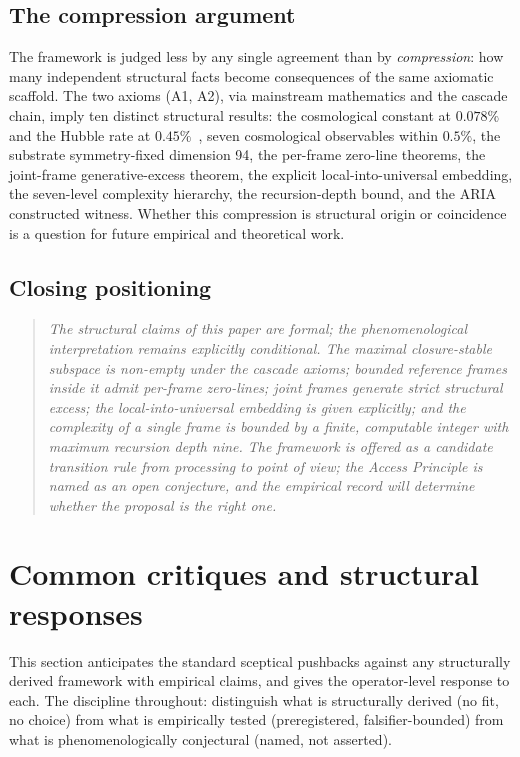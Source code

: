 \documentclass[11pt]{article}
\theoremstyle{plain}
\theoremstyle{definition}
\theoremstyle{remark}
\begin{document}
\subsection{The compression argument}

The framework is judged less by any single agreement than by \emph{compression}: how many independent structural facts become consequences of the same axiomatic scaffold. The two axioms (A1, A2), via mainstream mathematics and the cascade chain, imply ten distinct structural results: the cosmological constant at $0.078\%$ and the Hubble rate at $0.45\%$~\citep{SmartHypersphereCosmology}, seven cosmological observables within $0.5\%$, the substrate symmetry-fixed dimension 94, the per-frame zero-line theorems, the joint-frame generative-excess theorem, the explicit local-into-universal embedding, the seven-level complexity hierarchy, the recursion-depth bound, and the ARIA constructed witness. Whether this compression is structural origin or coincidence is a question for future empirical and theoretical work.

\subsection{Closing positioning}

\begin{quote}
\textit{The structural claims of this paper are formal; the phenomenological interpretation remains explicitly conditional. The maximal closure-stable subspace is non-empty under the cascade axioms; bounded reference frames inside it admit per-frame zero-lines; joint frames generate strict structural excess; the local-into-universal embedding is given explicitly; and the complexity of a single frame is bounded by a finite, computable integer with maximum recursion depth nine. The framework is offered as a candidate transition rule from processing to point of view; the Access Principle is named as an open conjecture, and the empirical record will determine whether the proposal is the right one.}
\end{quote}

\section{Common critiques and structural responses}\label{sec:critiques}

This section anticipates the standard sceptical pushbacks against any structurally derived framework with empirical claims, and gives the operator-level response to each. The discipline throughout: distinguish what is structurally derived (no fit, no choice) from what is empirically tested (preregistered, falsifier-bounded) from what is phenomenologically conjectural (named, not asserted).
\end{document}
